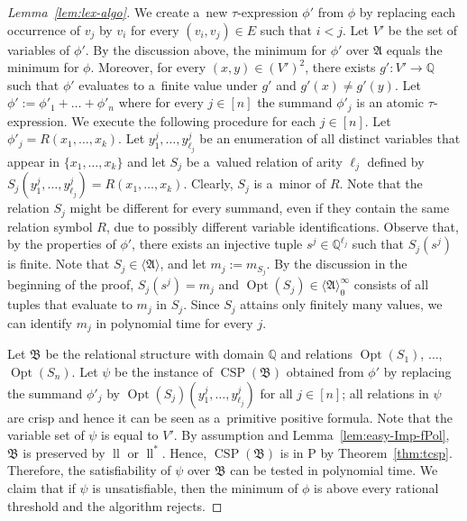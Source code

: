 \documentclass[preprint,12pt]{elsarticle}
\newcommand{\Q}{\mathbb Q}
\newcommand{\bA}{{\mathfrak A}}
\newcommand{\bB}{{\mathfrak B}}
\newcommand{\checked}[1]{#1}
\DeclareMathOperator{\CSP}{CSP}
\DeclareMathOperator{\Opt}{Opt}
\DeclareMathOperator{\lele}{ll}
\begin{document}
\begin{proof}[Lemma~\ref{lem:lex-algo}]
We create a~new $\tau$-expression $\phi'$ from $\phi$ by replacing each occurrence of $v_j$ by $v_i$ for every $(v_i, v_j) \in E$ such that $i<j$. Let $V'$ be the set of variables of $\phi'$.
By the discussion above, the minimum for $\phi'$ over $\bA$ equals the minimum for $\phi$.
Moreover, for every $(x,y) \in (V')^2$, there exists $g' \colon V' \to \Q$ such that $\phi'$ evaluates to a~finite value under $g'$ and $g'(x) \neq g'(y)$.
Let $\phi' := \phi'_1 + \dots + \phi'_n$ where for every $j \in [n]$ the summand $\phi'_j$ is an atomic $\tau$-expression. We execute the following procedure for each $j \in [n]$. Let $\phi'_j=R(x_1, \dots, x_k)$. Let $y_1^j, \dots, y_{\ell_j}^j$ be an enumeration of all distinct variables that appear in $\{x_1, \dots, x_k\}$ and let $S_j$ be a~valued relation of arity $\ell_j$
defined by $S_j(y_1^j, \dots, y_{\ell_j}^j)=R(x_1, \dots, x_k)$. Clearly, $S_j$ is a~minor of $R$. Note that the relation $S_j$ might be different for every summand, even if they contain the same relation symbol $R$, due to possibly different variable identifications. Observe that, by the properties of $\phi'$, there exists an injective tuple $s^j \in \Q^{\ell_j}$ such that $S_j(s^j)$ is finite.
Note that $S_j \in \langle \bA \rangle$, and let $m_j := m_{S_j}$.
By the discussion in the beginning of the proof, $S_j(s^j)=m_{j}$ and $\Opt(S_j) \in \langle \bA \rangle_0 ^\infty$ consists of all tuples that evaluate to $m_{j}$ in $S_j$. Since $S_j$ attains only finitely many values, we can identify $m_j$ in polynomial time for every $j$.

Let $\bB$ be the relational structure with domain $\mathbb Q$ and relations $\Opt(S_1)$, $\dots$, $\Opt(S_n)$. Let $\psi$ be the instance of $\CSP(\bB)$ obtained from $\phi'$ by replacing the summand $\phi'_j$ by $\Opt(S_j)(y_1^j, \dots, y_{\ell_j}^j)$ for all $j \in [n]$; all relations in $\psi$ are crisp and hence it can be seen as a~primitive positive formula. Note that the variable set of $\psi$ is equal to $V'$.
%
By assumption \checked{and Lemma~\ref{lem:easy-Imp-fPol},}
\checked{$\bB$} is preserved by  
$\lele$ or $\lele^*$.
Hence, $\CSP(\bB)$ is in P by Theorem~\ref{thm:tcsp}.
Therefore, the satisfiability of $\psi$ over $\bB$ can be tested in polynomial time.
We claim that if $\psi$ is unsatisfiable, then the minimum of $\phi$ is above every rational threshold and the algorithm rejects. 



\end{proof}
\end{document}
